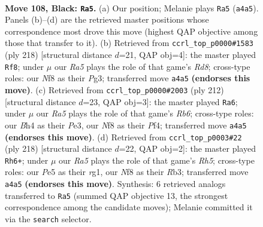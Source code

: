 \documentclass[11pt]{article}
\begin{document}
\clearpage

\begin{figure}[p]\centering
\begin{subfigure}{0.46\textwidth}\centering
\resizebox{\linewidth}{!}{%
\newchessgame
\chessboard[
  setfen={5n2/1R6/7p/4p3/r5kb/3p4/1K6/8 b - - 13 108},
  showmover=false,
  pgfstyle=straightmove, color=movearrow, markmove={a4-a5}
]}
\caption{}
\end{subfigure}\hfill
\begin{subfigure}{0.46\textwidth}\centering
\resizebox{\linewidth}{!}{%
\newchessgame
\chessboard[
  setfen={3R4/8/8/8/r3k1p1/6P1/3K1P2/8 w - - 21 110},
  showmover=false,
  pgfstyle=straightmove, color=movearrow, markmove={d8-f8}
]}
\caption{}
\end{subfigure}
\\[4pt]
\begin{subfigure}{0.46\textwidth}\centering
\resizebox{\linewidth}{!}{%
\newchessgame
\chessboard[
  setfen={8/6k1/1R6/5p2/5P1K/4P3/6r1/8 w - - 91 107},
  showmover=false,
  pgfstyle=straightmove, color=movearrow, markmove={b6-a6}
]}
\caption{}
\end{subfigure}\hfill
\begin{subfigure}{0.46\textwidth}\centering
\resizebox{\linewidth}{!}{%
\newchessgame
\chessboard[
  setfen={8/8/2r2k2/7R/5P2/1R6/4KP2/6r1 w - - 71 110},
  showmover=false,
  pgfstyle=straightmove, color=movearrow, markmove={h5-h6}
]}
\caption{}
\end{subfigure}
\caption{\textbf{Move 108, Black: \texttt{Ra5}.} (a) Our position; Melanie plays \texttt{Ra5} (\texttt{a4a5}). Panels (b)--(d) are the retrieved master positions whose correspondence most drove this move (highest QAP objective among those that transfer to it). (b) Retrieved from \texttt{ccrl\_top\_p0000\#1583} (ply 218) [structural distance $d$=21, QAP obj=4]: the master played \texttt{Rf8}; under $\mu$ our \emph{Ra5} plays the role of that game's \emph{Rd8}; cross-type roles: our \emph{N}f8 as their \emph{P}g3; transferred move \texttt{a4a5} \textbf{(endorses this move)}. (c) Retrieved from \texttt{ccrl\_top\_p0000\#2003} (ply 212) [structural distance $d$=23, QAP obj=3]: the master played \texttt{Ra6}; under $\mu$ our \emph{Ra5} plays the role of that game's \emph{Rb6}; cross-type roles: our \emph{B}h4 as their \emph{P}e3, our \emph{N}f8 as their \emph{P}f4; transferred move \texttt{a4a5} \textbf{(endorses this move)}. (d) Retrieved from \texttt{ccrl\_top\_p0003\#22} (ply 218) [structural distance $d$=22, QAP obj=2]: the master played \texttt{Rh6+}; under $\mu$ our \emph{Ra5} plays the role of that game's \emph{Rh5}; cross-type roles: our \emph{P}e5 as their \emph{r}g1, our \emph{N}f8 as their \emph{R}b3; transferred move \texttt{a4a5} \textbf{(endorses this move)}. Synthesis: 6 retrieved analogs transferred to \texttt{Ra5} (summed QAP objective 13, the strongest correspondence among the candidate moves); Melanie committed it via the \texttt{search} selector.}
\label{fig:thought-m215}
\end{figure}
\end{document}
